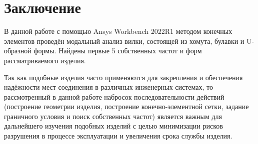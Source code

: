 \chapter*{Заключение} \label{ch-conclusion}

В данной работе с помощью Ansys Workbench 2022R1 методом конечных элементов проведён модальный анализ вилки, состоящей из хомута, булавки и U-образной формы. Найдены первые 5 собственных частот и форм рассматриваемого изделия.

Так как подобные изделия часто применяются для закрепления и обеспечения надёжности мест соединения в различных инженерных системах, то рассмотренный в данной работе набросок последовательности действий (построение геометрии изделия, построение конечно-элементной сетки, задание граничного условия и поиск собственных частот) является важным для дальнейшего изучения подобных изделий с целью минимизации рисков разрушения в процессе эксплуатации и увеличения срока службы изделия.



